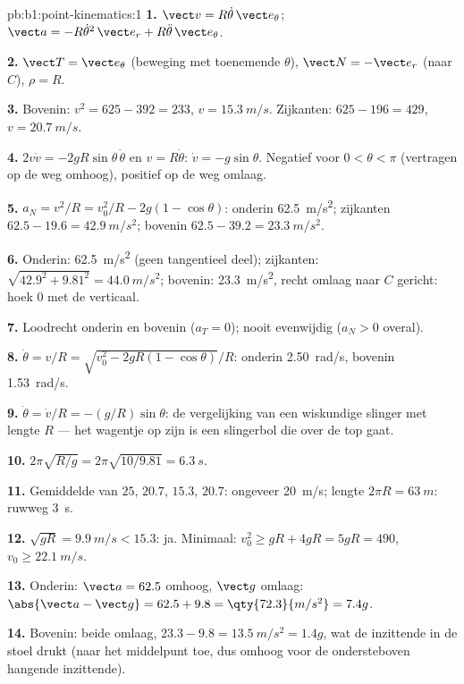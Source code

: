 \begin{solution}{pb:b1:point-kinematics:1}
\textbf{1.} $\vect v = R\dot\theta\,\vect e_\theta$; $\vect a = -R\dot\theta^2
\,\vect e_r + R\ddot\theta\,\vect e_\theta$.

\textbf{2.} $\vect T = \vect e_\theta$ (beweging met toenemende $\theta$),
$\vect N = -\vect e_r$ (naar $C$), $\rho = R$.

\textbf{3.} Bovenin: $v^2 = 625 - 392 = 233$, $v = \qty{15.3}{m/s}$. Zijkanten:
$625 - 196 = 429$, $v = \qty{20.7}{m/s}$.

\textbf{4.} $2v\dot v = -2gR\sin\theta\,\dot\theta$ en $v = R\dot\theta$:
$\dot v = -g\sin\theta$. Negatief voor $0 < \theta < \pi$ (vertragen op de
weg omhoog), positief op de weg omlaag.

\textbf{5.} $a_N = v^2/R = v_0^2/R - 2g(1 - \cos\theta)$: onderin
\qty{62.5}{m/s^2}; zijkanten $62.5 - 19.6 = \qty{42.9}{m/s^2}$; bovenin $62.5 -
39.2 = \qty{23.3}{m/s^2}$.

\textbf{6.} Onderin: \qty{62.5}{m/s^2} (geen tangentieel deel); zijkanten:
$\sqrt{42.9^2 + 9.81^2} = \qty{44.0}{m/s^2}$; bovenin: \qty{23.3}{m/s^2},
recht omlaag naar $C$ gericht: hoek $0$ met de verticaal.

\textbf{7.} Loodrecht onderin en bovenin ($a_T = 0$); nooit
evenwijdig ($a_N > 0$ overal).

\textbf{8.} $\dot\theta = v/R = \sqrt{v_0^2 - 2gR(1 - \cos\theta)}/R$:
onderin \qty{2.50}{rad/s}, bovenin \qty{1.53}{rad/s}.

\textbf{9.} $\ddot\theta = \dot v/R = -(g/R)\sin\theta$: de vergelijking van een
wiskundige slinger met lengte $R$ --- het wagentje op zijn  is een slingerbol
die over de top gaat.

\textbf{10.} $2\pi\sqrt{R/g} = 2\pi\sqrt{10/9.81} = \qty{6.3}{s}$.

\textbf{11.} Gemiddelde van $25$, $20.7$, $15.3$, $20.7$: ongeveer \qty{20}{m/s};
lengte $2\pi R = \qty{63}{m}$: ruwweg \qty{3}{s}.

\textbf{12.} $\sqrt{gR} = \qty{9.9}{m/s} < 15.3$: ja. Minimaal: $v_0^2 \geq
gR + 4gR = 5gR = 490$, $v_0 \geq \qty{22.1}{m/s}$.

\textbf{13.} Onderin: $\vect a = 62.5$ omhoog, $\vect g$ omlaag:
$\abs{\vect a - \vect g} = 62.5 + 9.8 = \qty{72.3}{m/s^2} = 7.4g$.

\textbf{14.} Bovenin: beide omlaag, $23.3 - 9.8 = \qty{13.5}{m/s^2} = 1.4g$,
wat de inzittende in de stoel drukt (naar het middelpunt toe, dus omhoog voor
de ondersteboven hangende inzittende).


\end{solution}

